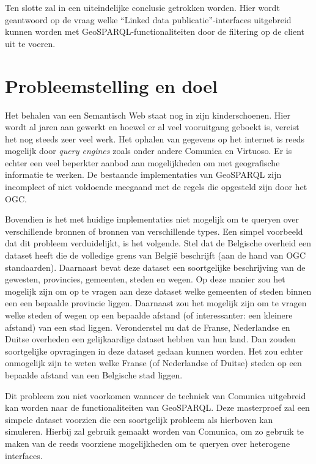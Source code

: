 Ten slotte zal in  een uiteindelijke conclusie getrokken worden. Hier wordt geantwoord op de vraag welke ``Linked data publicatie''-interfaces uitgebreid kunnen worden met GeoSPARQL-functionaliteiten door de filtering op de client uit te voeren.


\section{Probleemstelling en doel}
\label{sec:probleemstelling_doel}
Het behalen van een Semantisch Web staat nog in zijn kinderschoenen. Hier wordt al jaren aan gewerkt en hoewel er al veel vooruitgang geboekt is, vereist het nog steeds zeer veel werk. Het ophalen van gegevens op het internet is reeds mogelijk door \textit{query engines} zoals onder andere Comunica en Virtuoso. Er is echter een veel beperkter aanbod aan mogelijkheden om met geografische informatie te werken. De bestaande implementaties van GeoSPARQL zijn incompleet of niet voldoende meegaand met de regels die opgesteld zijn door het OGC. 

Bovendien is het met huidige implementaties niet mogelijk om te queryen over verschillende bronnen of bronnen van verschillende types. Een simpel voorbeeld dat dit probleem verduidelijkt, is het volgende. Stel dat de Belgische overheid een dataset heeft die de volledige grens van België beschrijft (aan de hand van OGC standaarden). Daarnaast bevat deze dataset een soortgelijke beschrijving van de gewesten, provincies, gemeenten, steden en wegen. Op deze manier zou het mogelijk zijn om op te vragen aan deze dataset welke gemeenten of steden binnen een een bepaalde provincie liggen. Daarnaast zou het mogelijk zijn om te vragen welke steden of wegen op een bepaalde afstand (of interessanter: een kleinere afstand) van een stad liggen. Veronderstel nu dat de Franse, Nederlandse en Duitse overheden een gelijkaardige dataset hebben van hun land. Dan zouden soortgelijke opvragingen in deze dataset gedaan kunnen worden. Het zou echter onmogelijk zijn te weten welke Franse (of Nederlandse of Duitse) steden op een bepaalde afstand van een Belgische stad liggen. 

Dit probleem zou niet voorkomen wanneer de techniek van Comunica uitgebreid kan worden naar de functionaliteiten van GeoSPARQL. Deze masterproef zal een simpele dataset voorzien die een soortgelijk probleem als hierboven kan simuleren. Hierbij zal gebruik gemaakt worden van Comunica, om zo gebruik te maken van de reeds voorziene mogelijkheden om te queryen over heterogene interfaces. 



